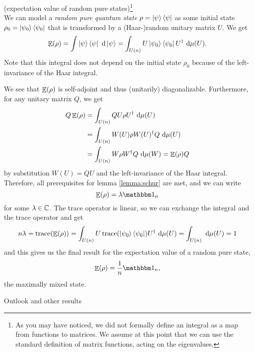 \documentclass[a4paper,11pt, BCOR=4mm, DIV=12, pagesize]{scrartcl}
\begin{document}
\begin{example}(expectation value of random pure states)\footnote{As you may 
have noticed, we did not formally define an 
integral as a map from functions to matrices. We assume at this point that we 
can use the standard definition of matrix functions, acting on the 
eigenvalues.}\\
 We can model a \emph{random pure quantum state} $\rho = \ket{\psi}\bra{\psi}$ 
as some initial state $\rho_0 = \ket{\psi_0}\bra{\psi_0}$ that is 
transformed by a (Haar-)random unitary matrix $U$. We get 
\begin{equation}
 \mathop{\mathbb{E}}(\rho) = \int \ket{\psi}\bra{\psi}\ \mathrm{d}\ket{\psi} = 
 \int_{{U(n)}} U\ket{\psi_0}\bra{\psi_0}U^\dagger\ \mathrm{d}\mu(U).
\end{equation}
Note that this integral does not depend on the initial state $\rho_0$ because 
of the left-invariance of the Haar integral.

We see that $\mathop{\mathbb{E}}(\rho)$ is self-adjoint and thus (unitarily) diagonalizable. 
Furthermore, for any unitary matrix $Q$, we get 
\begin{align*}
 Q\mathop{\mathbb{E}}(\rho) &= \int_{U(n)} QU\rho U^\dagger\ \mathrm{d}\mu(U)\\
 &= \int_{U(n)} W(U)\rho W(U)^\dagger Q\ \mathrm{d}\mu(U)\\
 &= \int_{U(n)} W\rho W^\dagger Q\ \mathrm{d}\mu(W) = \mathop{\mathbb{E}}(\rho)Q
\end{align*}
by substitution $W(U) = QU$ and the left-invariance of the Haar integral. 
Therefore, all prerequisites for lemma \ref{lemma:schur} are met, and we can 
write 
\begin{equation}
 \E(\rho) = \lambda\ind_n
\end{equation}
for some $\lambda\in\mathbb{C}$. The trace operator is linear, so we can exchange the 
integral and the trace operator and get 
\begin{equation}
 n\lambda = \mathop{\mathrm{trace}}(\mathop{\mathbb{E}}(\rho)) = \int_{U(n)} 
U\mathop{\mathrm{trace}}(\ket{\psi_0}\bra{\psi_0})U^\dagger\ \mathrm{d}\mu(U) = \int_{U(n)}\ \mathrm{d}\mu(U) 
= 1
\end{equation}
and this gives us the final result for the expectation value of a random pure 
state,
\begin{equation}
 \E(\rho) = \frac 1 n \ind_n,
\end{equation}
the maximally mixed state.
\end{example}

\todo Outlook and other results


\begin{spacing}{1}
{}

\end{spacing}
\end{document}
